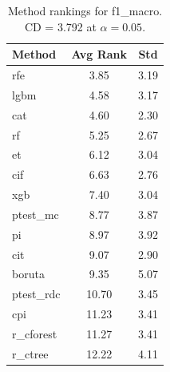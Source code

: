 \begin{table}[h]
\centering
\caption{Method rankings for f1_macro. CD = 3.792 at $\alpha=0.05$.}
\label{tab:ranks_f1_macro}
\begin{tabular}{lcc}
\toprule
Method & Avg Rank & Std \\
\midrule
rfe & 3.85 & 3.19 \\
lgbm & 4.58 & 3.17 \\
cat & 4.60 & 2.30 \\
rf & 5.25 & 2.67 \\
et & 6.12 & 3.04 \\
cif & 6.63 & 2.76 \\
xgb & 7.40 & 3.04 \\
ptest_mc & 8.77 & 3.87 \\
pi & 8.97 & 3.92 \\
cit & 9.07 & 2.90 \\
boruta & 9.35 & 5.07 \\
ptest_rdc & 10.70 & 3.45 \\
cpi & 11.23 & 3.41 \\
r_cforest & 11.27 & 3.41 \\
r_ctree & 12.22 & 4.11 \\
\bottomrule
\end{tabular}
\end{table}